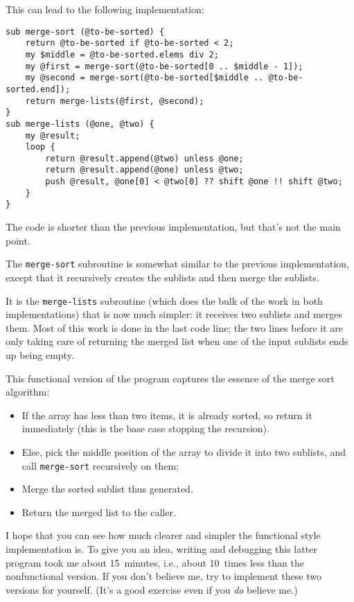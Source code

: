 This can lead to the following implementation:

\begin{verbatim}
sub merge-sort (@to-be-sorted) {
    return @to-be-sorted if @to-be-sorted < 2;
    my $middle = @to-be-sorted.elems div 2;
    my @first = merge-sort(@to-be-sorted[0 .. $middle - 1]);
    my @second = merge-sort(@to-be-sorted[$middle .. @to-be-sorted.end]);
    return merge-lists(@first, @second);
}
sub merge-lists (@one, @two) {
    my @result;
    loop {
        return @result.append(@two) unless @one;
        return @result.append(@one) unless @two;
        push @result, @one[0] < @two[0] ?? shift @one !! shift @two;
    }
} 
\end{verbatim}

The code is shorter than the previous implementation, but 
that's not the main point.

The {\tt merge-sort} subroutine is somewhat similar to 
the previous implementation, except that it recursively 
creates the sublists and then merge the sublists.

It is the {\tt merge-lists} subroutine (which does the bulk 
of the work in both implementations) that is now much 
simpler: it receives two sublists and merges them. Most of this 
work is done in the last code line; the two lines before it 
are only taking care of returning the merged list when one 
of the input sublists ends up being empty.

This functional version of the program captures  
the essence of the merge sort algorithm:
\begin{itemize}
\item If the  array has less than two items, it is already 
sorted, so return it immediately (this is the base case 
stopping the recursion).
\item Else, pick the middle position of the array to divide 
it into two sublists, and call \verb'merge-sort' recursively 
on them;
\item Merge the sorted sublist thus generated.
\item Return the merged list to the caller.
\end{itemize}

I hope that you can see how much clearer and simpler the 
functional style implementation is. To give you an idea, 
writing and debugging this latter program took me about 
15~minutes, i.e., about 10~times less than the 
nonfunctional version. If you don't believe me, try to 
implement these two versions for yourself. (It's a good 
exercise even if you \emph{do} believe me.)

